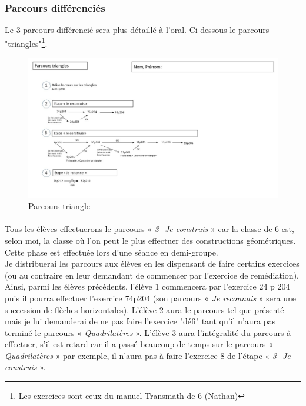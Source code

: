 \subsubsection*{Parcours différenciés}\label{parcours_diff3}
Le 3 parcours différencié sera plus détaillé à l'oral. Ci-dessous le parcours "triangles"\footnote{Les exercices sont ceux du manuel Transmath de 6\up{} (Nathan)}.
\begin{figure}[!h]
	\centering
	\includegraphics[scale=0.4]{img/parcours_triangles.jpg}
	\caption{Parcours triangle}
\end{figure}
\paragraph{}Tous les élèves effectuerons le parcours « \textit{3- Je construis} » car la classe de 6 est, selon moi, la classe où l'on peut le plus effectuer des constructions géométriques. Cette phase est effectuée lors d'une séance en demi-groupe.\\
Je distribuerai les parcours aux élèves en les dispensant de faire certains exercices (ou au contraire en leur demandant de commencer par l'exercice de remédiation).\\
Ainsi, parmi les élèves précédents, l'élève 1 commencera par l'exercice 24 p 204 puis il pourra effectuer l'exercice 74p204 (son parcours « \textit{Je reconnais} » sera une succession de flèches horizontales). L'élève 2 aura le parcours tel que présenté mais je lui demanderai de ne pas faire l'exercice "défi" tant qu'il n'aura pas terminé le parcours « \textit{Quadrilatères} ». L'élève 3 aura l'intégralité du parcours à effectuer, s'il est retard car il a passé beaucoup de temps sur le parcours « \textit{Quadrilatères} » par exemple, il n'aura pas à faire l'exercice 8 de l'étape « \textit{3- Je construis} ».
